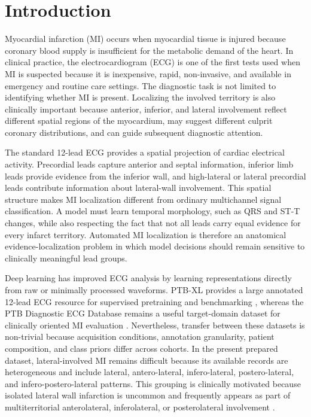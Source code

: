\documentclass[a4paper,fleqn]{cas-dc}
\begin{document}


\section{Introduction}
Myocardial infarction (MI) occurs when myocardial tissue is injured because coronary blood supply is
insufficient for the metabolic demand of the heart. In clinical practice, the electrocardiogram
(ECG) is one of the first tests used when MI is suspected because it is inexpensive, rapid,
non-invasive, and available in emergency and routine care settings. The diagnostic task is not
limited to identifying whether MI is present. Localizing the involved territory is also clinically
important because anterior, inferior, and lateral involvement reflect different spatial regions of
the myocardium, may suggest different culprit coronary distributions, and can guide subsequent
diagnostic attention.

The standard 12-lead ECG provides a spatial projection of cardiac electrical activity. Precordial
leads capture anterior and septal information, inferior limb leads provide evidence from the
inferior wall, and high-lateral or lateral precordial leads contribute information about
lateral-wall involvement. This spatial structure makes MI localization different from ordinary
multichannel signal classification. A model must learn temporal morphology, such as QRS and ST-T
changes, while also respecting the fact that not all leads carry equal evidence for every infarct
territory. Automated MI localization is therefore an anatomical evidence-localization problem in
which model decisions should remain sensitive to clinically meaningful lead groups.

Deep learning has improved ECG analysis by learning representations directly from raw or minimally
processed waveforms. PTB-XL provides a large annotated 12-lead ECG resource for supervised
pretraining and benchmarking
\cite{Wagner2020SciData_PTBXL,StrodthoffWagnerSchaeffterSamek2021JBHI_PTBXL_Benchmarks}, whereas the
PTB Diagnostic ECG Database remains a useful target-domain dataset for clinically oriented MI
evaluation \cite{Bousseljot1995PTB,Goldberger2000PhysioBank}. Nevertheless, transfer between these
datasets is non-trivial because acquisition conditions, annotation granularity, patient composition,
and class priors differ across cohorts. In the present prepared dataset, lateral-involved MI remains
difficult because its available records are heterogeneous and include lateral, antero-lateral,
infero-lateral, postero-lateral, and infero-postero-lateral patterns. This grouping is clinically
motivated because isolated lateral wall infarction is uncommon and frequently appears as part of
multiterritorial anterolateral, inferolateral, or posterolateral involvement
\cite{Ludhwani2024LateralWallMI}.
\end{document}
